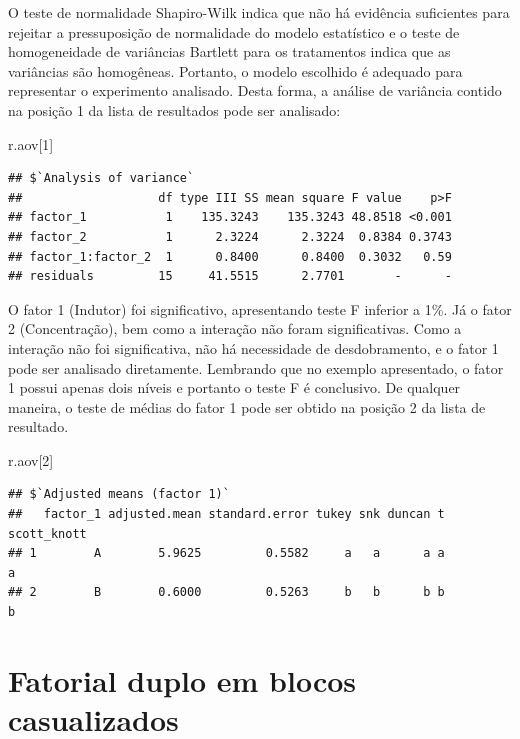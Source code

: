\documentclass[
]{article}
\newenvironment{Shaded}{\begin{snugshade}}{\end{snugshade}}
\newcommand{\DecValTok}[1]{\textcolor[rgb]{0.00,0.00,0.81}{#1}}
\newcommand{\NormalTok}[1]{#1}
\begin{document}
O teste de normalidade Shapiro-Wilk indica que não há evidência suficientes para rejeitar a pressuposição de normalidade do modelo estatístico e o teste de homogeneidade de variâncias Bartlett para os tratamentos indica que as variâncias são homogêneas. Portanto, o modelo escolhido é adequado para representar o experimento analisado. Desta forma, a análise de variância contido na posição 1 da lista de resultados pode ser analisado:

\begin{Shaded}
\begin{Highlighting}[]
\NormalTok{r.aov[}\DecValTok{1}\NormalTok{]}
\end{Highlighting}
\end{Shaded}

\begin{verbatim}
## $`Analysis of variance`
##                   df type III SS mean square F value    p>F
## factor_1           1    135.3243    135.3243 48.8518 <0.001
## factor_2           1      2.3224      2.3224  0.8384 0.3743
## factor_1:factor_2  1      0.8400      0.8400  0.3032   0.59
## residuals         15     41.5515      2.7701       -      -
\end{verbatim}

O fator 1 (Indutor) foi significativo, apresentando teste F inferior a 1\%. Já o fator 2 (Concentração), bem como a interação não foram significativas. Como a interação não foi significativa, não há necessidade de desdobramento, e o fator 1 pode ser analisado diretamente. Lembrando que no exemplo apresentado, o fator 1 possui apenas dois níveis e portanto o teste F é conclusivo. De qualquer maneira, o teste de médias do fator 1 pode ser obtido na posição 2 da lista de resultado.

\begin{Shaded}
\begin{Highlighting}[]
\NormalTok{r.aov[}\DecValTok{2}\NormalTok{]}
\end{Highlighting}
\end{Shaded}

\begin{verbatim}
## $`Adjusted means (factor 1)`
##   factor_1 adjusted.mean standard.error tukey snk duncan t scott_knott
## 1        A        5.9625         0.5582     a   a      a a           a
## 2        B        0.6000         0.5263     b   b      b b           b
\end{verbatim}

\hypertarget{fatorial-duplo-em-blocos-casualizados}{%
\section{Fatorial duplo em blocos casualizados}\label{fatorial-duplo-em-blocos-casualizados}}
\end{document}
